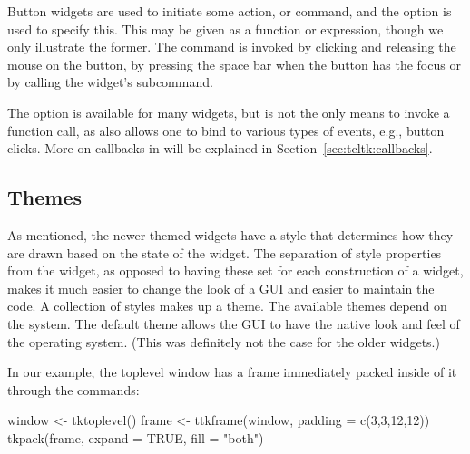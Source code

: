 Button widgets are used to initiate  some action, or
command, and the  option is used to specify this. This
may be given as a function or expression, though we only illustrate
the former. The command is invoked by clicking and releasing the mouse
on the button, by pressing the space bar when the button has the focus
or by calling the widget's 
subcommand. 

The  option is available for many widgets, but is not
the only means to invoke a function call, as \Tk{} also allows one to
bind to various types of events, e.g., button clicks.  More on
callbacks in  will be explained in
Section~\ref{sec:tcltk:callbacks}.




\subsection{Themes}
\label{sec:tcltk:overview:themes}


As mentioned, the newer themed widgets have a style that determines
how they are drawn based on the state of the widget. The separation of
style properties from the widget, as opposed to having these set for
each construction of a widget, makes it much easier to change the look
of a GUI and easier to maintain the code. A collection of styles makes
up a theme. The available themes depend on the system. The default
theme allows the GUI to have the native look and feel of the operating
system. (This was definitely not the case for the older \TK\/
widgets.)

In our example, the toplevel window has a frame immediately packed
inside of it through the commands:
\begin{Schunk}
\begin{Sinput}
 window <- tktoplevel()
 frame <- ttkframe(window, padding = c(3,3,12,12))
 tkpack(frame, expand = TRUE, fill = "both")
\end{Sinput}
\end{Schunk}

